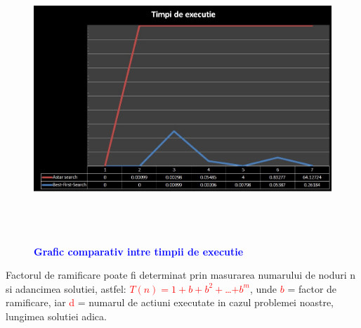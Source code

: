 \documentclass{article}
\begin{document}
\begin{flushleft}
\begin{figure}
    \centering
    \begin{center}
      \includegraphics[width=15cm,height=10cm]{timpi-executie.jpg}
      \bfseries \caption{\textbf{\textcolor{blue}{Grafic comparativ intre timpii de executie}}}
    \end{center}
\end{figure}



Factorul de ramificare poate fi determinat prin masurarea numarului de noduri n si adancimea solutiei, astfel: \textcolor{red}{$T(n)=1+b+b^2+$\dots$+b^m$}, unde \textcolor{red}{$b$} = factor de ramificare, iar \textcolor{red}{d} = numarul de actiuni executate in cazul problemei noastre, lungimea solutiei adica.\\
\vspace{50cm}


\end{flushleft}
\end{document}
